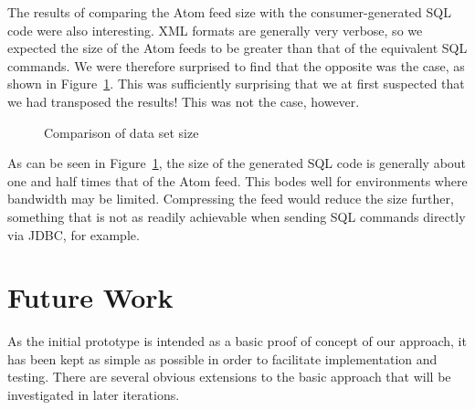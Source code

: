 \documentclass{CRPITStyle}
\begin{document}
The results of comparing the Atom feed size with the consumer-generated
SQL code were also interesting. XML formats are generally very verbose,
so we expected the size of the Atom feeds to be greater than that of the
equivalent SQL commands. We were therefore surprised to find that the
opposite was the case, as shown in Figure~\ref{fig-sizes}. This was
sufficiently surprising that we at first suspected that we had
transposed the results! This was not the case, however.


\begin{figure}
	\caption{Comparison of data set size}
	\label{fig-sizes}
\end{figure}


As can be seen in Figure~\ref{fig-sizes}, the size of the generated SQL
code is generally about one and half times that of the Atom feed. This
bodes well for environments where bandwidth may be limited. Compressing
the feed would reduce the size further, something that is not as readily
achievable when sending SQL commands directly via JDBC, for example.


\section{Future Work}
\label{sec-future-work}

As the initial prototype is intended as a basic proof of concept of our
approach, it has been kept as simple as possible in order to facilitate
implementation and testing. There are several obvious extensions to the
basic approach that will be investigated in later iterations.
\end{document}
